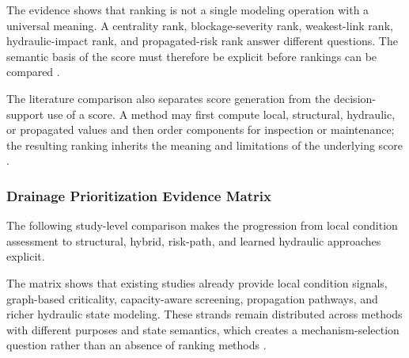 The evidence shows that ranking is not a single modeling operation with
a universal meaning. A centrality rank, blockage-severity rank,
weakest-link rank, hydraulic-impact rank, and propagated-risk rank
answer different questions. The semantic basis of the score must
therefore be explicit before rankings can be compared
\citep{simone2022,dastgir2023,meijer2023,zhang2025}.






The literature comparison also separates score generation from the
decision-support use of a score. A method may first compute local,
structural, hydraulic, or propagated values and then order components for
inspection or maintenance; the resulting ranking inherits the meaning
and limitations of the underlying score \citep{simone2022,dastgir2023,
meijer2023,zhang2025}.

\subsubsection{Drainage Prioritization Evidence
Matrix}\label{drainage-prioritization-evidence-matrix}

The following study-level comparison makes the progression from local
condition assessment to structural, hybrid, risk-path, and learned
hydraulic approaches explicit.






The matrix shows that existing studies already provide local condition
signals, graph-based criticality, capacity-aware screening, propagation
pathways, and richer hydraulic state modeling. These strands remain
distributed across methods with different purposes and state semantics,
which creates a mechanism-selection question rather than an absence of ranking
methods \citep{iqbal2021,simone2022,dastgir2023,meijer2023,zhang2024,
zhang2025}.

